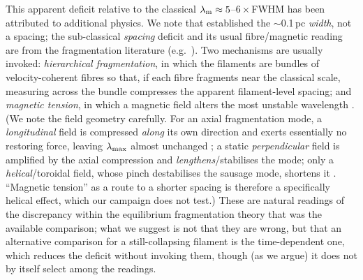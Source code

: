 \documentclass[usenatbib,twoside,twocolumn]{mnras}
\begin{document}
This apparent deficit relative to the classical $\lambda_{\rm m}\approx5$--$6\times$FWHM has been attributed to additional physics. We note that \citet{Arzoumanian2019} established the $\sim$0.1\,pc \emph{width}, not a spacing; the sub-classical \emph{spacing} deficit and its usual fibre/magnetic reading are from the fragmentation literature (e.g.\ \citealt{Fischera2012,Zhang2023cal}). Two mechanisms are usually invoked: \emph{hierarchical fragmentation}, in which the filaments are bundles of velocity-coherent fibres \citep{Hacar2013,Hacar2018,Yang2024} so that, if each fibre fragments near the classical scale, measuring across the bundle compresses the apparent filament-level spacing; and \emph{magnetic tension}, in which a magnetic field alters the most unstable wavelength \citep{Nakamura1993}. (We note the field geometry carefully. For an axial fragmentation mode, a \emph{longitudinal} field is compressed \emph{along} its own direction and exerts essentially no restoring force, leaving $\lambda_{\rm max}$ almost unchanged \citep[][consistent with our $\theta=0^\circ$ runs being nearly $\beta$-independent]{Nagasawa1987,Nakamura1993}; a static \emph{perpendicular} field is amplified by the axial compression and \emph{lengthens}/stabilises the mode; only a \emph{helical}/toroidal field, whose pinch destabilises the sausage mode, shortens it \citep{Fiege2000}. ``Magnetic tension'' as a route to a shorter spacing is therefore a specifically helical effect, which our campaign does not test.) These are natural readings of the discrepancy within the equilibrium fragmentation theory that was the available comparison; what we suggest is not that they are wrong, but that an alternative comparison for a still-collapsing filament is the time-dependent one, which reduces the deficit without invoking them, though (as we argue) it does not by itself select among the readings.
\end{document}
